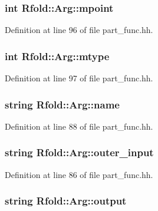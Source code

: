 \hypertarget{class_rfold_1_1_arg_a273269902f8a9b9974c1d46800df16e9}{
\subsubsection[{mpoint}]{\setlength{\rightskip}{0pt plus 5cm}int Rfold\+::\+Arg\+::mpoint}}\label{class_rfold_1_1_arg_a273269902f8a9b9974c1d46800df16e9}


Definition at line 96 of file part\+\_\+func.\+hh.

\hypertarget{class_rfold_1_1_arg_a9736867f9aac222c47efa0b5218fc8fa}{
\subsubsection[{mtype}]{\setlength{\rightskip}{0pt plus 5cm}int Rfold\+::\+Arg\+::mtype}}\label{class_rfold_1_1_arg_a9736867f9aac222c47efa0b5218fc8fa}


Definition at line 97 of file part\+\_\+func.\+hh.

\hypertarget{class_rfold_1_1_arg_a38ab74cced49339e67fe8f70bb6827fb}{
\subsubsection[{name}]{\setlength{\rightskip}{0pt plus 5cm}string Rfold\+::\+Arg\+::name}}\label{class_rfold_1_1_arg_a38ab74cced49339e67fe8f70bb6827fb}


Definition at line 88 of file part\+\_\+func.\+hh.

\hypertarget{class_rfold_1_1_arg_ae62e02353945f6073c46c27c7f583649}{
\subsubsection[{outer\+\_\+input}]{\setlength{\rightskip}{0pt plus 5cm}string Rfold\+::\+Arg\+::outer\+\_\+input}}\label{class_rfold_1_1_arg_ae62e02353945f6073c46c27c7f583649}


Definition at line 86 of file part\+\_\+func.\+hh.

\hypertarget{class_rfold_1_1_arg_a172c943d9eafc1bfc27fde48db831f5d}{
\subsubsection[{output}]{\setlength{\rightskip}{0pt plus 5cm}string Rfold\+::\+Arg\+::output}}\label{class_rfold_1_1_arg_a172c943d9eafc1bfc27fde48db831f5d}


